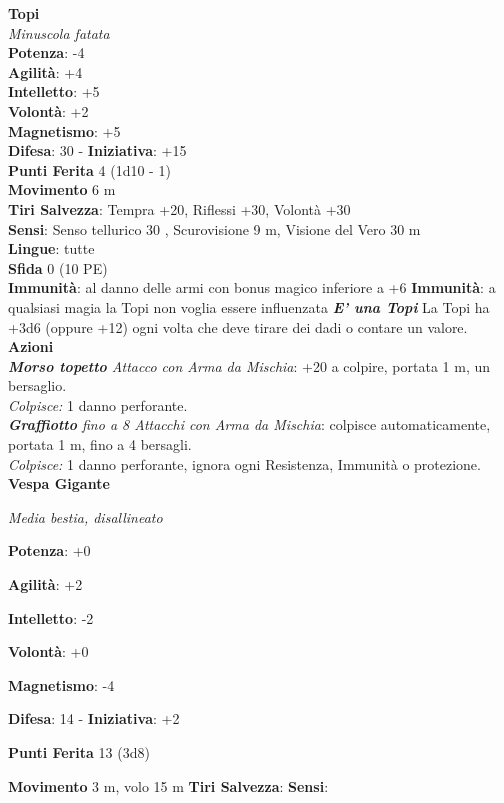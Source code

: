 \begin{multicols}{2}
\medskip\textbf{Topi}\\
\emph{Minuscola fatata}\\
\textbf{Potenza}: -4\\
\textbf{Agilità}: +4\\
\textbf{Intelletto}: +5\\
\textbf{Volontà}: +2\\
\textbf{Magnetismo}: +5\\
\textbf{Difesa}: 30 - \textbf{Iniziativa}: +15\\
\textbf{Punti Ferita} 4 (1d10 - 1)\\
\textbf{Movimento} 6 m\\
\textbf{Tiri Salvezza}: Tempra +20, Riflessi +30, Volontà +30 \\
\textbf{Sensi}: Senso tellurico 30 , Scurovisione 9 m, Visione del Vero 30 m\\
\textbf{Lingue}: tutte\\
\textbf{Sfida} 0 (10 PE)\smallskip\\
\textbf{Immunità}: al danno delle armi con bonus magico inferiore a +6
\textbf{Immunità}: a qualsiasi magia la Topi non voglia essere influenzata
\emph{\textbf{E' una Topi}} La Topi ha +3d6 (oppure +12) ogni volta che deve tirare dei dadi o contare un valore.
\smallskip\textbf{Azioni}\\
\emph{\textbf{Morso topetto} Attacco con Arma da Mischia}: +20 a colpire, portata 1 m, un bersaglio.\\
\emph{Colpisce:} 1 danno perforante.\\
\emph{\textbf{Graffiotto} fino a 8 Attacchi con Arma da Mischia}: colpisce automaticamente, portata 1 m, fino a 4 bersagli.\\
\emph{Colpisce:} 1 danno perforante, ignora ogni Resistenza, Immunità o protezione.\\


\textbf{Vespa Gigante}

\emph{Media bestia, disallineato}

\textbf{Potenza}: +0

\textbf{Agilità}: +2

\textbf{Intelletto}: -2

\textbf{Volontà}: +0

\textbf{Magnetismo}: -4

\textbf{Difesa}: 14 - \textbf{Iniziativa}: +2

\textbf{Punti Ferita} 13 (3d8)

\textbf{Movimento} 3 m, volo 15 m
\textbf{Tiri Salvezza}:
\textbf{Sensi}: 


\end{multicols}
